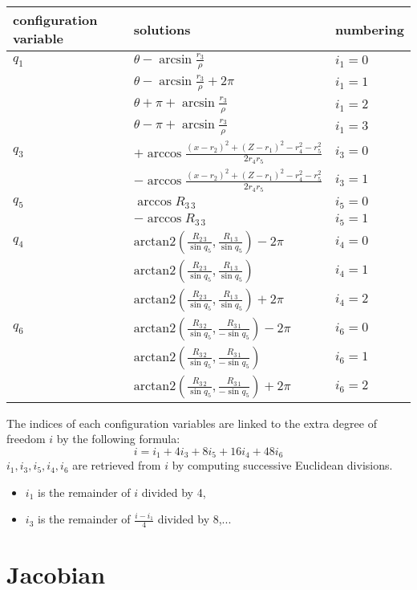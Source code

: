 \documentclass{article}
\begin{document}
\begin{tabular}{|l|l|l|}
  \hline
  configuration variable & solutions & numbering \\
  \hline
  $q_1$ & $\theta - \arcsin \frac{r_3}{\rho}$ & $i_1=0$\\
   & $\theta - \arcsin \frac{r_3}{\rho} + 2\pi$ & $i_1=1$\\
   & $\theta + \pi + \arcsin\frac{r_3}{\rho}$& $i_1=2$ \\
   & $\theta - \pi + \arcsin\frac{r_3}{\rho}$& $i_1=3$\\
  \hline
  $q_3$ & $+ \arccos \frac{(x-r_2)^2 + (Z-r_1)^2 - r_4^2 - r_5^2}{2r_4r_5}$ & $i_3=0$\\
  &$- \arccos \frac{(x-r_2)^2 + (Z-r_1)^2 - r_4^2 - r_5^2}{2r_4r_5}$ & $i_3=1$ \\
  \hline
  $q_5$ & $\arccos R_{3\,3}$ & $i_5 =0$ \\
  & $-\arccos R_{3\,3}$ & $i_5=1$ \\
  \hline
  $q_4$ & $\mbox{arctan2}(\frac{R_{2\,3}}{\sin q_5}, \frac{R_{1\,3}}{\sin q_5}) -2\pi$ & $i_4=0$ \\
        & $\mbox{arctan2}(\frac{R_{2\,3}}{\sin q_5}, \frac{R_{1\,3}}{\sin q_5})$ & $i_4=1$\\
        & $\mbox{arctan2}(\frac{R_{2\,3}}{\sin q_5}, \frac{R_{1\,3}}{\sin q_5}) + 2\pi$ & $i_4=2$ \\
  \hline
  $q_6$ &$\mbox{arctan2}(\frac{R_{3\,2}}{\sin q_5}, \frac{R_{3\,1}}{-\sin q_5}) -2\pi$ & $i_6=0$ \\
        &$\mbox{arctan2}(\frac{R_{3\,2}}{\sin q_5}, \frac{R_{3\,1}}{-\sin q_5})$ & $i_6=1$ \\
  &$\mbox{arctan2}(\frac{R_{3\,2}}{\sin q_5}, \frac{R_{3\,1}}{-\sin q_5}) + 2\pi$ & $i_6=2$ \\
  \hline
\end{tabular}
The indices of each configuration variables are linked to the extra degree of freedom $i$ by the
following formula:
$$
i = i_1 + 4 i_3 + 8 i_5 + 16 i_4 + 48 i_6
$$
$i_1,i_3,i_5,i_4,i_6$ are retrieved from $i$ by computing successive Euclidean divisions.
\begin{itemize}
\item $i_1$ is the remainder of $i$ divided by 4,
\item $i_3$ is the remainder of $\frac{i-i_1}{4}$ divided by 8,...
\end{itemize}

\section{Jacobian}
\end{document}
